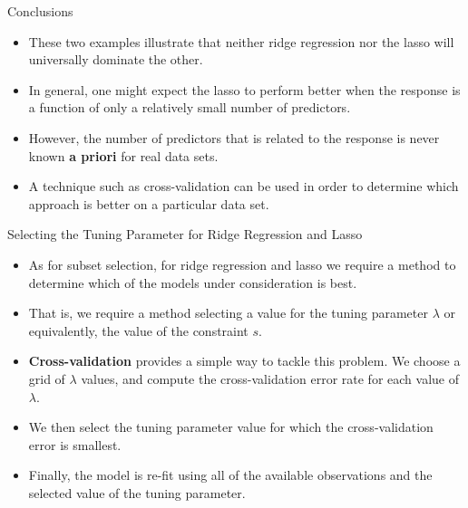 \documentclass[aspectratio=169, 11pt]{beamer}
\begin{document}
\begin{frame}{Conclusions}
    \begin{itemize}
        \item These two examples illustrate that neither ridge regression nor the lasso will universally dominate the other.
        \item In general, one might expect the lasso to perform better when the response is a function of only a relatively small number of predictors.
        \item However, the number of predictors that is related to the response is never known \textbf{a priori} for real data sets.
        \item A technique such as cross-validation can be used in order to determine which approach is better on a particular data set.
    \end{itemize}
\end{frame}

\begin{frame}{Selecting the Tuning Parameter for Ridge Regression and Lasso}
    \begin{itemize}
        \item As for subset selection, for ridge regression and lasso we require a method to determine which of the models under consideration is best.
        \item That is, we require a method selecting a value for the tuning parameter $\lambda$ or equivalently, the value of the constraint $s$.
        \item \textbf{Cross-validation} provides a simple way to tackle this problem. We choose a grid of $\lambda$ values, and compute the cross-validation error rate for each value of $\lambda$.
        \item We then select the tuning parameter value for which the cross-validation error is smallest.
        \item Finally, the model is re-fit using all of the available observations and the selected value of the tuning parameter.
    \end{itemize}
\end{frame}
\end{document}
